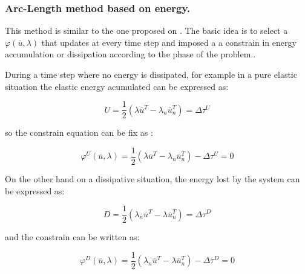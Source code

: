 \subsubsection{Arc-Length method based on energy.}

This method is similar to the one proposed on \cite{arclength_borst}. The basic idea is to select a
$\varphi(\overline{u},\lambda)$  that updates at every time step and imposed a a constrain in energy accumulation or
dissipation according to the phase of the problem.. 

During a time step where no energy is dissipated, for example in a pure elastic situation the elastic energy acumulated
can be expressed as:

\begin{equation}
U = \frac{1}{2}\left( \lambda \overline{u}^T - \lambda_n \overline{u}_{n}^T \right) = \Delta \tau^U
\end{equation}

so the constrain equation can be fix as :

\begin{equation}
\varphi^U(\overline{u},\lambda) = 
\frac{1}{2}\left( \lambda \overline{u}^T - \lambda_n \overline{u}_{n}^T \right) - \Delta
\tau^U = 0
\end{equation}

On the other hand on a dissipative situation, the energy lost by the system can be expressed as:

\begin{equation}
D = \frac{1}{2}\left( \lambda_n \overline{u}^T - \lambda \overline{u}_{n}^T \right) = \Delta \tau^D
\end{equation}

and the constrain can be written as:

\begin{equation}
\varphi^D(\overline{u},\lambda) = 
\frac{1}{2}\left( \lambda_n \overline{u}^T - \lambda \overline{u}_{n}^T \right) - \Delta
\tau^D = 0
\end{equation}

